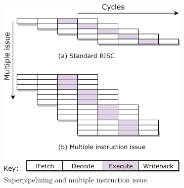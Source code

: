 \begin{figure}[H]
\centering
\includegraphics[width=.5\textwidth]{figures/pipelining}
\caption{Superpipelining and multiple instruction issue\cite{tta_codegen}.}
\label{fig:pipelining}
\end{figure}






